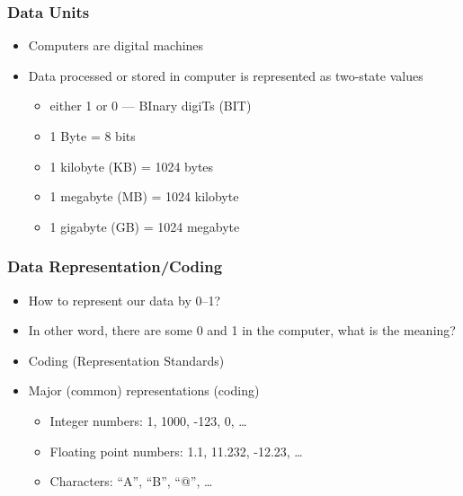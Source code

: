 \documentclass{../c-lecture}
\begin{document}
\begin{frame}
  \frametitle{Data Units}
  \begin{itemize}
    \item Computers are digital machines
    \item Data processed or stored in computer is represented as two-state values
    \begin{itemize}
      \item either 1 or 0 --- BInary digiTs (BIT)
      \item 1 Byte = 8 bits
      \item 1 kilobyte (KB) = 1024 bytes
      \item 1 megabyte (MB) = 1024 kilobyte
      \item 1 gigabyte (GB) = 1024 megabyte
    \end{itemize}
  \end{itemize}
\end{frame}

\begin{frame}
  \frametitle{Data Representation/Coding}
  \begin{itemize}
    \item How to represent our data by 0--1?
    \item In other word, there are some 0 and 1 in the computer, what is the meaning?
    \item {\color{YellowOrange} Coding (Representation Standards)}
    \item Major (common) representations (coding)
    \begin{itemize}
      \item Integer numbers: 1, 1000, -123, 0, \ldots
      \item Floating point numbers: 1.1, 11.232, -12.23, \ldots
      \item Characters: ``A'', ``B'', ``@'', \ldots
    \end{itemize}
  \end{itemize}
\end{frame}
\end{document}
